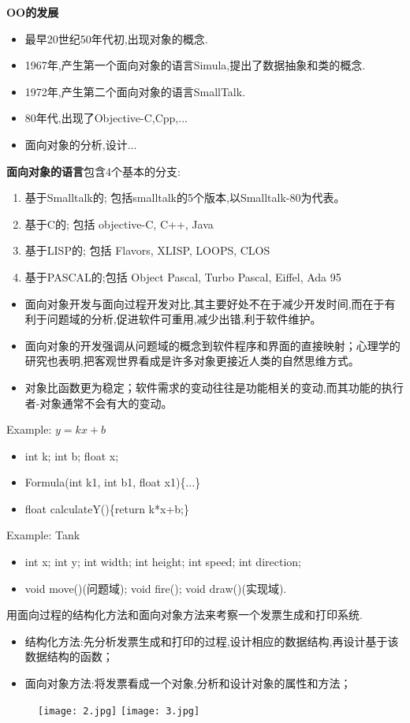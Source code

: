 \documentclass[../main.tex]{subfiles}
\begin{document}
\textbf{OO的发展}
\begin{itemize}
  \item 最早20世纪50年代初,出现对象的概念.
  \item 1967年,产生第一个面向对象的语言Simula,提出了数据抽象和类的概念.
  \item 1972年,产生第二个面向对象的语言SmallTalk.
  \item 80年代,出现了Objective-C,Cpp,...
  \item 面向对象的分析,设计...
\end{itemize}
\textbf{面向对象的语言}包含4个基本的分支:
\begin{enumerate}
  \item 基于Smalltalk的; 包括smalltalk的5个版本,以Smalltalk-80为代表。
  \item 基于C的; 包括 objective-C, C++, Java
  \item 基于LISP的; 包括 Flavors, XLISP, LOOPS, CLOS
  \item 基于PASCAL的;包括 Object Pascal, Turbo Pascal, Eiffel, Ada 95
\end{enumerate}
\begin{itemize}
  \item 面向对象开发与面向过程开发对比,其主要好处不在于减少开发时间,而在于有利于问题域的分析,促进软件可重用,减少出错,利于软件维护。
  \item 面向对象的开发强调从问题域的概念到软件程序和界面的直接映射；心理学的研究也表明,把客观世界看成是许多对象更接近人类的自然思维方式。
  \item 对象比函数更为稳定；软件需求的变动往往是功能相关的变动,而其功能的执行者-对象通常不会有大的变动。
\end{itemize}
Example: $ y=kx+b $
\begin{itemize}
  \item int k; int b; float x;
  \item Formula(int k1, int b1, float x1)\{...\}
  \item float calculateY()\{return k*x+b;\}
\end{itemize}
Example: Tank
\begin{itemize}
  \item int x; int y; int width; int height; int speed; int direction;
  \item void move()(问题域); void fire(); void draw()(实现域).
\end{itemize}
用面向过程的结构化方法和面向对象方法来考察一个发票生成和打印系统.
\begin{itemize}
  \item 结构化方法:先分析发票生成和打印的过程,设计相应的数据结构,再设计基于该数据结构的函数；
  \item 面向对象方法:将发票看成一个对象,分析和设计对象的属性和方法；
\end{itemize}
\begin{figure}[H]
  \texttt{[image: 2.jpg]}
  \texttt{[image: 3.jpg]}
\end{figure}
\end{document}
